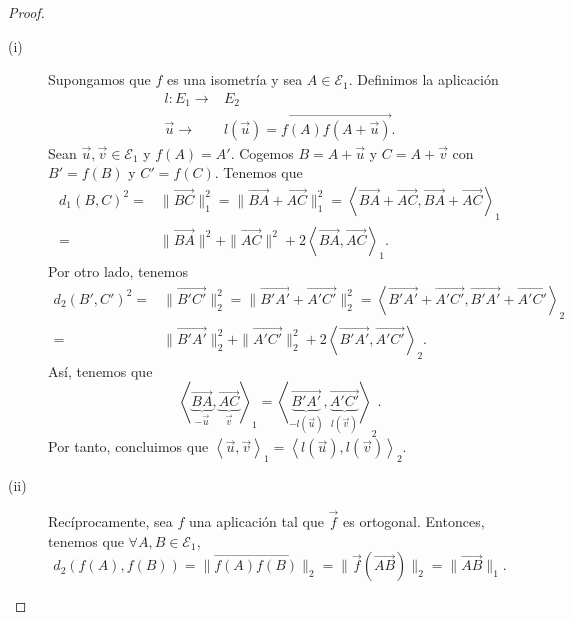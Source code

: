 \begin{proof}
\begin{description}
\item[(i)] Supongamos que $\displaystyle f $ es una isometría y sea $\displaystyle A \in \mathcal{E}_{1} $. Definimos la aplicación
	\[
	\begin{split}
		l : E_{1} \to & E_{2} \\
		\vec{u} \to & l\left(\vec{u}\right) = \overrightarrow{f\left(A\right)f\left(A+\vec{u}\right)}.
	\end{split}
	\]
Sean $\displaystyle \vec{u}, \vec{v} \in \mathcal{E}_{1} $ y $\displaystyle f\left(A\right)  = A' $. Cogemos $\displaystyle B = A + \vec{u} $ y $\displaystyle C = A + \vec{v} $ con $\displaystyle B' = f\left(B\right)$ y $\displaystyle C' = f\left(C\right) $. Tenemos que 
\[
\begin{split}
	d _{1}\left(B,C\right)^{2} = & \|\overrightarrow{BC}\|^{2}_{1} = \|\overrightarrow{BA}+\overrightarrow{AC}\|^{2}_{1} = \left\langle \overrightarrow{BA} + \overrightarrow{AC}, \overrightarrow{BA} + \overrightarrow{AC} \right\rangle _{1} \\
= & \|\overrightarrow{BA}\|^{2} + \|\overrightarrow{AC}\|^{2} + 2\left\langle \overrightarrow{BA}, \overrightarrow{AC} \right\rangle _{1} .
\end{split}
\]
Por otro lado, tenemos 
\[
\begin{split}
	d _{2}\left(B',C'\right)^{2} = & \|\overrightarrow{B'C'}\|^{2}_{2} = \|\overrightarrow{B'A'} + \overrightarrow{A'C'}\|^{2}_{2} = \left\langle \overrightarrow{B'A'}+\overrightarrow{A'C'}, \overrightarrow{B'A'}+\overrightarrow{A'C'} \right\rangle _{2} \\
= & \|\overrightarrow{B'A'}\|^{2}_{2} + \|\overrightarrow{A'C'}\|^{2}_{2} + 2\left\langle \overrightarrow{B'A'}, \overrightarrow{A'C'} \right\rangle _{2}.
\end{split}
\]
Así, tenemos que 
\[\left\langle \underbrace{\overrightarrow{BA}}_{-\vec{u}}, \underbrace{\overrightarrow{AC}}_{\vec{v}} \right\rangle _{1} = \left\langle \underbrace{\overrightarrow{B'A'}}_{-l\left(\vec{u}\right)}, \underbrace{\overrightarrow{A'C'}}_{l\left(\vec{v}\right)} \right\rangle _{2} .\]
Por tanto, concluimos que $\displaystyle \left\langle \vec{u}, \vec{v} \right\rangle _{1} = \left\langle l\left(\vec{u}\right), l\left(\vec{v}\right) \right\rangle _{2} $.
\item[(ii)] Recíprocamente, sea $\displaystyle f $ una aplicación tal que $\displaystyle \vec{f} $ es ortogonal. Entonces, tenemos que $\displaystyle \forall A,B \in \mathcal{E}_{1} $,
	\[d _{2}\left(f\left(A\right), f\left(B\right)\right) = \|\overrightarrow{f\left(A\right)f\left(B\right)}\|_{2} = \|\vec{f}\left(\overrightarrow{AB}\right)\|_{2} = \|\overrightarrow{AB}\|_{1} .\]
\end{description}
\end{proof}
